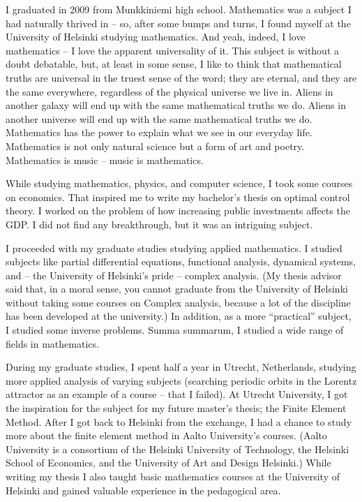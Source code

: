 \documentclass{article}
\begin{document}
        \parbox{\textwidth} {

          I graduated in 2009 from Munkkiniemi high school. Mathematics was a subject I had naturally thrived in -- so, after some bumps and turns,  I found myself at the University of Helsinki studying mathematics. And yeah, indeed, I love mathematics -- I love the apparent universality of it. This subject is without a doubt debatable, but, at least in some sense, I like to think that mathematical truths are universal in the truest sense of the word; they are eternal, and they are the same everywhere, regardless of the physical universe we live in. Aliens in another galaxy will end up with the same mathematical truths we do. Aliens in another universe will end up with the same mathematical truths we do. Mathematics has the power to explain what we see in our everyday life. Mathematics is not only natural science but a form of art and poetry. Mathematics is music -- music is mathematics.

          While studying mathematics, physics, and computer science, I took some courses on economics. That inspired me to write my bachelor's thesis on optimal control theory. I worked on the problem of how increasing public investments affects the GDP. I did not find any breakthrough, but it was an intriguing subject.

          I proceeded with my graduate studies studying applied mathematics. I studied subjects like partial differential equations, functional analysis, dynamical systems, and  -- the University of Helsinki's pride -- complex analysis. (My thesis advisor said that, in a moral sense, you cannot graduate from the University of Helsinki without taking some courses on Complex analysis, because a lot of the discipline has been developed at the university.) In addition, as a more ``practical'' subject, I studied some inverse problems. Summa summarum, I studied a wide range of fields in mathematics.

          During my graduate studies, I spent half a year in Utrecht, Netherlands, studying more applied analysis of varying subjects (searching periodic orbits in the Lorentz attractor as an example of a course -- that I failed). At Utrecht University, I got the inspiration for the subject for my future master's thesis; the Finite Element Method. After I got back to Helsinki from the exchange, I had a chance to study more about the finite element method in Aalto University's courses. (Aalto University is a consortium of the Helsinki University of Technology, the Helsinki School of Economics, and the University of Art and Design Helsinki.) While writing my thesis I also taught basic mathematics courses at the University of Helsinki and gained valuable experience in the pedagogical area.

}
\end{document}
